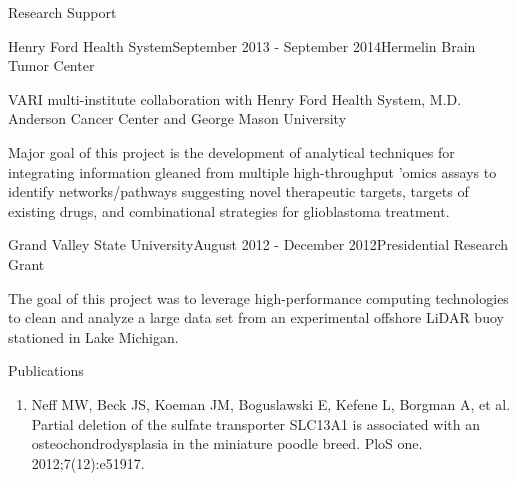 \documentclass{resume} %
\begin{document}

\begin{rSection}{Research Support}
\begin{rSubsection}{Henry Ford Health System}{September 2013 - September 2014}{Hermelin Brain Tumor Center}{}
\item VARI multi-institute collaboration with Henry Ford Health System, M.D. Anderson Cancer Center and George Mason University
\item Major goal of this project is the development of analytical techniques for integrating information gleaned from multiple high-throughput ’omics assays to identify networks/pathways suggesting novel therapeutic targets, targets of existing drugs, and combinational strategies for glioblastoma treatment.
\end{rSubsection}

\begin{rSubsection}{Grand Valley State University}{August 2012 - December 2012}{Presidential Research Grant}{}
\item The goal of this project was to leverage high-performance computing technologies to clean and analyze a large data set from an experimental offshore LiDAR buoy stationed in Lake Michigan.
\end{rSubsection}

\end{rSection}


\begin{rSection}{Publications}
\begin{enumerate}
\item Neff MW, Beck JS, Koeman JM, Boguslawski E, Kefene L, Borgman A, et al. Partial deletion of the sulfate transporter SLC13A1 is associated with an osteochondrodysplasia in the miniature poodle breed. PloS one. 2012;7(12):e51917.
\end{enumerate}
\end{rSection}

\end{document}
